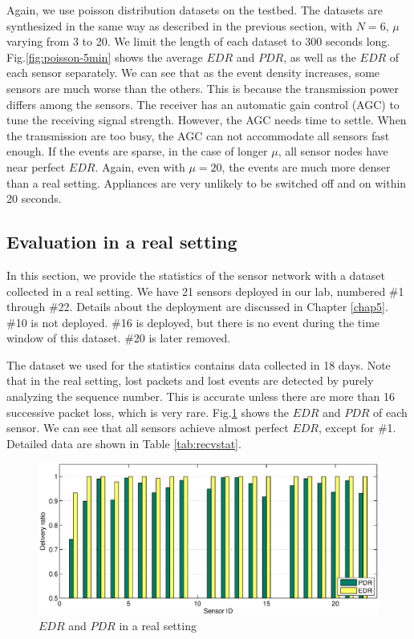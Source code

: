 Again, we use poisson distribution datasets on the testbed. The datasets are synthesized in the same way as described in the previous section, with $N = 6$, $\mu$ varying from 3 to 20. We limit the length of each dataset to 300 seconds long. Fig.\ref{fig:poisson-5min} shows the average $EDR$ and $PDR$, as well as the $EDR$ of each sensor separately. We can see that as the event density increases, some sensors are much worse than the others. This is because the transmission power differs among the sensors. The receiver has an automatic gain control (AGC) to tune the receiving signal strength. However, the AGC needs time to settle. When the transmission are too busy, the AGC can not accommodate all sensors fast enough. If the events are sparse, in the case of longer $\mu$, all sensor nodes have near perfect $EDR$. Again, even with $\mu=20$, the events are much more denser than a real setting. Appliances are very unlikely to be switched off and on within 20 seconds. 

\subsection{Evaluation in a real setting}

In this section, we provide the statistics of the sensor network with a dataset collected in a real setting. We have 21 sensors deployed in our lab, numbered \#1 through \#22. Details about the deployment are discussed in Chapter \ref{chap5}. \#10 is not deployed. \#16 is deployed, but there is no event during the time window of this dataset. \#20 is later removed. 

The dataset we used for the statistics contains data collected in 18 days. Note that in the real setting, lost packets and lost events are detected by purely analyzing the sequence number. This is accurate unless there are more than 16 successive packet loss, which is very rare. Fig.\ref{fig:real-edr-pdr} shows the $EDR$ and $PDR$ of each sensor. We can see that all sensors achieve almost perfect $EDR$, except for \#1. Detailed data are shown in Table \ref{tab:recvstat}.

\begin{figure}[htb]
  \centering
  \includegraphics[width=\textwidth]{../../sw/pc/matlab/testbed-result/real}
  \caption{$EDR$ and $PDR$ in a real setting}
  \label{fig:real-edr-pdr}
\end{figure}

